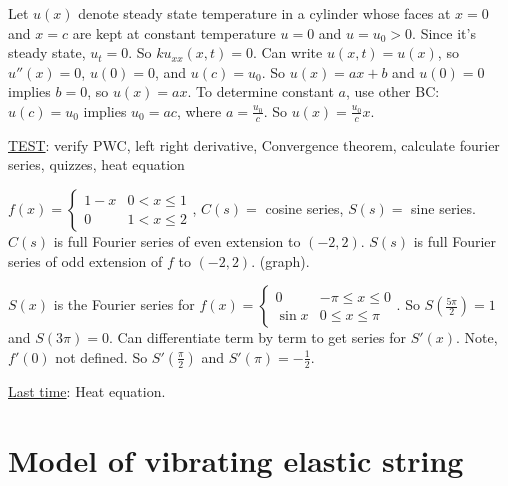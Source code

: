 \documentclass[]{article}
\begin{document}
\begin{example}
	Let $u(x) $ denote steady state temperature in a cylinder whose faces at $x=0$ and $x=c$ are kept at constant temperature $u=0$ and $u=u_0>0$.
	Since it's steady state, $u_t = 0$. So $ku_{xx}(x,t) = 0$. Can write $u(x,t) = u(x)$, so $u''(x) = 0$, $u(0) = 0$, and $u(c) = u_0$.
	So $u(x) = ax+b$ and $u(0) = 0$ implies $b=0$, so $u(x) = ax$. To determine constant $a$, use other BC: $u(c) = u_0$ implies $u_0 = ac$, where $a= \frac{u_0}{c}$. So $u(x) = \frac{u_0}{c}x$.
\end{example}

\underline{TEST}: verify PWC, left right derivative, Convergence theorem, calculate fourier series, quizzes, heat equation

\begin{example}
	[Q3.1] $f(x) = \begin{cases} 1-x & 0<x\leq 1 \\ 0 & 1 < x \leq 2 \end{cases}$, $C(s) = $ cosine series, $S(s) = $ sine series. $C(s)$ is full Fourier series of even extension to $(-2,2)$. $S(s)$ is full Fourier series of odd extension of $f$ to $(-2,2)$. (graph).
\end{example}
\begin{example}
	[Q3.2] $S(x)$ is the Fourier series for $f(x) = \begin{cases} 0 & -\pi \leq x \leq 0 \\ \sin{x} & 0\leq x \leq \pi \end{cases}$. So $S\left(\frac{5\pi}{2}\right) = 1$ and $S(3\pi) = 0$. Can differentiate term by term to get series for $S'(x)$. Note, $f'(0)$ not defined. So $S'\left( \frac{\pi}{2} \right)$ and $S'(\pi) = -\frac{1}{2}$.
\end{example}

\underline{Last time}: Heat equation.

\section{Model of vibrating elastic string}
\end{document}
